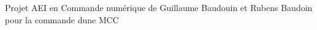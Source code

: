 Projet AEI en Commande numérique de Guillaume Baudouin et Rubens Baudoin pour la commande d\textquotesingle{}une MCC 